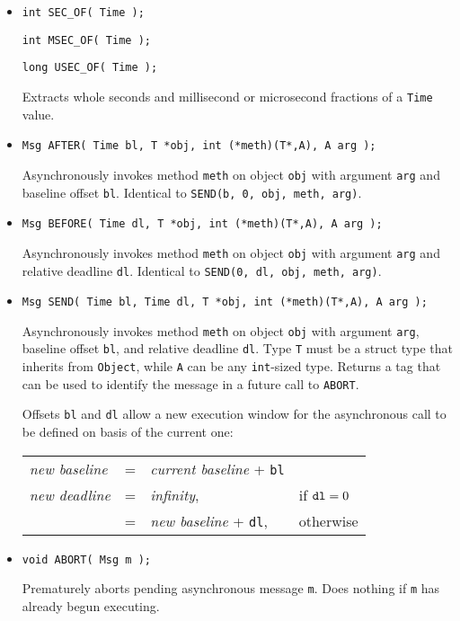 \documentclass[12pt]{article}
\begin{document}
\begin{itemize}
\item {\tt int SEC\_OF( Time );}

      {\tt int MSEC\_OF( Time );}

      {\tt long USEC\_OF( Time );}
      
Extracts whole seconds and millisecond or microsecond fractions of a {\tt Time} value.

\item {\tt Msg AFTER( Time bl, T *obj, int (*meth)(T*,A), A arg );}

Asynchronously invokes method {\tt meth} on object {\tt obj} with argument {\tt arg} and baseline offset {\tt bl}.  Identical to {\tt SEND(b, 0, obj, meth, arg)}.

\item {\tt Msg BEFORE( Time dl, T *obj, int (*meth)(T*,A), A arg );}

Asynchronously invokes method {\tt meth} on object {\tt obj} with argument {\tt arg} and relative deadline {\tt dl}.  Identical to {\tt SEND(0, dl, obj, meth, arg)}.

\item {\tt Msg SEND( Time bl, Time dl, T *obj, int (*meth)(T*,A), A arg );}

Asynchronously invokes method {\tt meth} on object {\tt obj} with argument {\tt arg}, baseline offset {\tt bl}, and relative deadline {\tt dl}.  Type {\tt T} must be a struct type that inherits from {\tt Object}, while {\tt A} can be any {\tt int}-sized type.  Returns a tag that can be used to identify the message in a future call to {\tt ABORT}.

Offsets {\tt bl} and {\tt dl} allow a new execution window for the asynchronous call to be defined on basis of the current one:
\begin{center}
\begin{tabular}{llll}
	{\em new baseline} & = & {\em current baseline} + {\tt bl} \\
         {\em new deadline} & = & {\em infinity},                            & if ${\tt dl} = 0$ \\
                                             & = & {\em new baseline} + {\tt dl}, & otherwise
\end{tabular}
\end{center}

\item {\tt void ABORT( Msg m );}

Prematurely aborts pending asynchronous message {\tt m}.  Does nothing if {\tt m} has already begun executing. 


\end{itemize}
\end{document}
